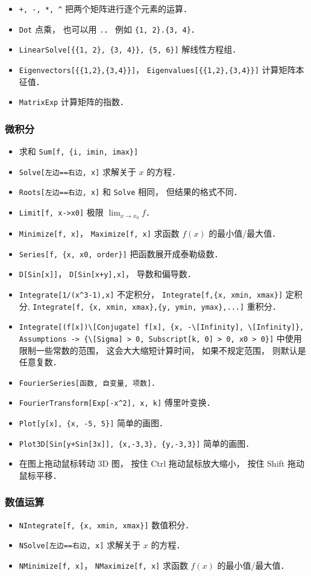 \begin{itemize}
\item \verb|+, -, *, ^| 把两个矩阵进行逐个元素的运算．
\item \verb|Dot| 点乘， 也可以用 \verb|.|． 例如 \verb|{1, 2}.{3, 4}|．
\item \verb|LinearSolve[{{1, 2}, {3, 4}}, {5, 6}]| 解线性方程组．
\item \verb|Eigenvectors[{{1,2},{3,4}}]|， \verb|Eigenvalues[{{1,2},{3,4}}]| 计算矩阵本征值．
\item \verb|MatrixExp| 计算矩阵的指数．
\end{itemize}

\subsubsection{微积分}
\begin{itemize}
\item 求和 \verb|Sum[f, {i, imin, imax}]|
\item \verb|Solve[左边==右边, x]| 求解关于 $x$ 的方程．
\item \verb|Roots[左边==右边, x]| 和 \verb|Solve| 相同， 但结果的格式不同．
\item \verb|Limit[f, x->x0]| 极限 $\lim_{x\to x_0} f$．
\item \verb|Minimize[f, x]|， \verb|Maximize[f, x]| 求函数 $f(x)$ 的最小值/最大值．
\item \verb|Series[f, {x, x0, order}]| 把函数展开成泰勒级数．
\item \verb|D[Sin[x]]|， \verb|D[Sin[x+y],x]|， 导数和偏导数．
\item \verb|Integrate[1/(x^3-1),x]| 不定积分， \verb|Integrate[f,{x, xmin, xmax}]| 定积分, \verb|Integrate[f, {x, xmin, xmax},{y, ymin, ymax},...]| 重积分．
\item \verb|Integrate[(f[x])\[Conjugate] f[x], {x, -\[Infinity], \[Infinity]}, Assumptions -> {\[Sigma] > 0, Subscript[k, 0] > 0, x0 > 0}]| 中使用限制一些常数的范围， 这会大大缩短计算时间， 如果不规定范围， 则默认是任意复数．
\item \verb|FourierSeries[函数, 自变量, 项数]|．
\item \verb|FourierTransform[Exp[-x^2], x, k]| 傅里叶变换．
\item \verb|Plot[y[x], {x, -5, 5}]| 简单的画图．
\item \verb|Plot3D[Sin[y+Sin[3x]], {x,-3,3}, {y,-3,3}]| 简单的画图．
\item 在图上拖动鼠标转动 3D 图， 按住 Ctrl 拖动鼠标放大缩小， 按住 Shift 拖动鼠标平移．
\end{itemize}

\subsubsection{数值运算}
\begin{itemize}
\item \verb|NIntegrate[f, {x, xmin, xmax}]| 数值积分．
\item \verb|NSolve[左边==右边, x]| 求解关于 $x$ 的方程．
\item \verb|NMinimize[f, x]|， \verb|NMaximize[f, x]| 求函数 $f(x)$ 的最小值/最大值．
\end{itemize}
